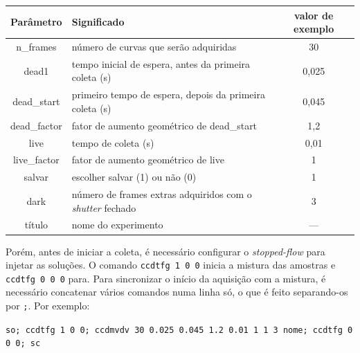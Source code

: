 			\begin{table}[H]
				{\begin{tabular}{c p{} c}
					\toprule
					 Parâmetro   & \centering Significado                                                     & valor de exemplo \\ \midrule
					 n\_frames   & \centering número de curvas que serão adquiridas                           & 30               \\
					   dead1     & \centering tempo inicial de espera, antes da primeira coleta (s)           & 0,025            \\
					dead\_start  & \centering primeiro tempo de espera, depois da primeira coleta (s)         & 0,045            \\
					dead\_factor & \centering fator de aumento geométrico de dead\_start                      & 1,2              \\
					    live     & \centering tempo de coleta (s)                                             & 0,01             \\
					live\_factor & \centering fator de aumento geométrico de live                             & 1                \\
					   salvar    & \centering escolher salvar (1) ou não (0)                                  & 1                \\
					    dark     & \centering número de frames extras adquiridos com o \emph{shutter} fechado & 3                \\
					   título    & \centering nome do experimento                                             & ---              \\ \bottomrule
				\end{tabular}}%
			{}
			\end{table}
			
			Porém, antes de iniciar a coleta, é necessário configurar o \emph{stopped-flow} para injetar as soluções. O comando \texttt{ccdtfg 1 0 0} inicia a mistura das amostras e \texttt{ccdtfg 0 0 0} para. Para sincronizar o início da aquisição com a mistura, é necessário concatenar vários comandos numa linha só, o que é feito separando-os por \texttt{;}. Por exemplo:
			
			\begin{center}
				\begin{footnotesize}
					\texttt{so; ccdtfg 1 0 0; ccdmvdv 30 0.025 0.045 1.2 0.01 1 1 3 nome; ccdtfg 0 0 0; sc}
				\end{footnotesize}
			\end{center}
	

